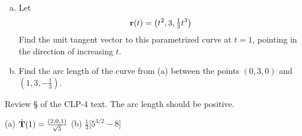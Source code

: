 \begin{question}[M317 2013D] %

\begin{enumerate}[(a)]
\item
Let
\begin{equation*}
\mathbf{r}(t) = \left(t^2 , 3, \tfrac{1}{3} t^3 \right) 
\end{equation*}
Find the unit tangent vector to this parametrized curve at $t = 1$, 
pointing in the direction of increasing $t$.
\item
Find the arc length of the curve from (a) between the points $(0, 3, 0)$ 
and $(1, 3, -\frac{1}{3})$.

\end{enumerate}
\end{question}

\begin{hint} 
Review \S{} of the CLP-4 text.
The arc length should be positive.
\end{hint}

\begin{answer} 
(a) $\hat{\mathbf{T}}(1) = \frac{(2,0,1)}{\sqrt{5}}$\qquad
(b) $\frac{1}{3}\big[5^{3/2}-8\big]$
\end{answer}

